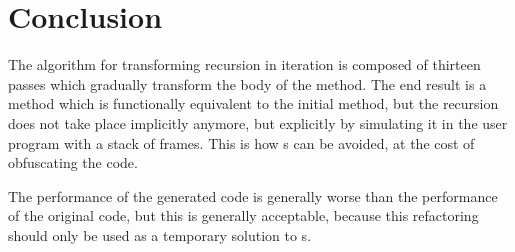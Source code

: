 \chapter{Conclusion}

The algorithm for transforming recursion in iteration is composed of thirteen passes which gradually transform the body
of the method. The end result is a method which is functionally equivalent to the initial method, but the recursion does
not take place implicitly anymore, but explicitly by simulating it in the user program with a stack of frames. This is
how s can be avoided, at the cost of obfuscating the code.

The performance of the generated code is generally worse than the performance of the original code, but this is
generally acceptable, because this refactoring should only be used as a temporary solution to
s.